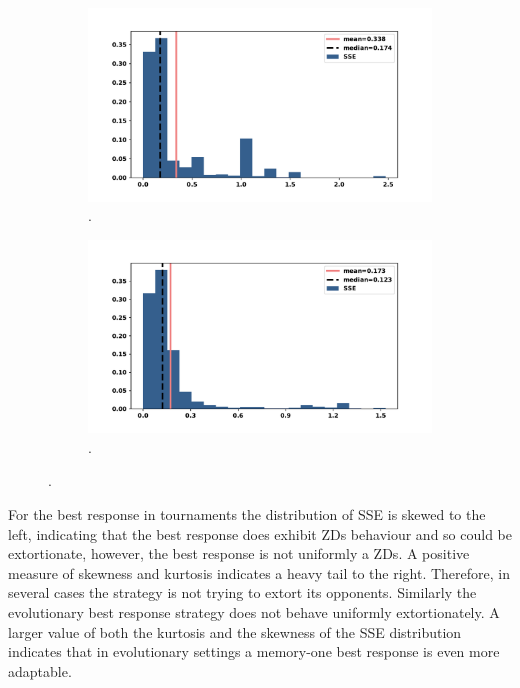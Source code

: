 \documentclass[10pt]{article}
\begin{document}
\begin{figure}[!htbp]
    \begin{subfigure}{0.5\textwidth}
        \begin{center}
            \includegraphics[width=\linewidth]{img/best_respones_sserror.pdf}
        \end{center}
        \caption{.}
    \end{subfigure}\hfill
    \begin{subfigure}{0.5\textwidth}
        \begin{center}
            \includegraphics[width=\linewidth]{img/evo_sserror.pdf}
        \end{center}
        \caption{.}
    \end{subfigure}
\end{figure}

For the best response in tournaments the distribution of SSE is skewed to the
left, indicating that the best response does exhibit ZDs behaviour and so could
be extortionate,
however, the best response is not uniformly a ZDs. A positive measure of
skewness and kurtosis indicates a heavy tail to the right. Therefore, in several
cases the strategy is not trying to extort its opponents. Similarly the
evolutionary best response strategy does not behave uniformly extortionately. A
larger value of both the kurtosis and the skewness of the SSE distribution
indicates that in evolutionary settings a memory-one best response is even more
adaptable.
\end{document}
